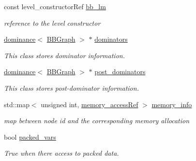\begin{DoxyCompactItemize}
const level\+\_\+constructor\+Ref \hyperlink{classFunctionBehavior_a0a756f4d5755287942bf6bb953820412}{bb\+\_\+lm}
\begin{DoxyCompactList}\small\item\em reference to the level constructor \end{DoxyCompactList}\item 
\hyperlink{classdominance}{dominance}$<$ \hyperlink{structBBGraph}{B\+B\+Graph} $>$ $\ast$ \hyperlink{classFunctionBehavior_ad902d08e8537e2e1ea4a28cbf8e51243}{dominators}
\begin{DoxyCompactList}\small\item\em This class stores dominator information. \end{DoxyCompactList}\item 
\hyperlink{classdominance}{dominance}$<$ \hyperlink{structBBGraph}{B\+B\+Graph} $>$ $\ast$ \hyperlink{classFunctionBehavior_aabc18a74b84928a2db6ae970bd74bda5}{post\+\_\+dominators}
\begin{DoxyCompactList}\small\item\em This class stores post-\/dominator information. \end{DoxyCompactList}\item 
std\+::map$<$ unsigned int, \hyperlink{function__behavior_8hpp_a37eb6f6bc2e166d30cc3ff2ee214d886}{memory\+\_\+access\+Ref} $>$ \hyperlink{classFunctionBehavior_a43f47c383d2e236f57ae91c3c0339a69}{memory\+\_\+info}
\begin{DoxyCompactList}\small\item\em map between node id and the corresponding memory allocation \end{DoxyCompactList}\item 
bool \hyperlink{classFunctionBehavior_a83aed93537871a44f2bc14938290e5c6}{packed\+\_\+vars}
\begin{DoxyCompactList}\small\item\em True when there access to packed data. \end{DoxyCompactList}\end{DoxyCompactItemize}
